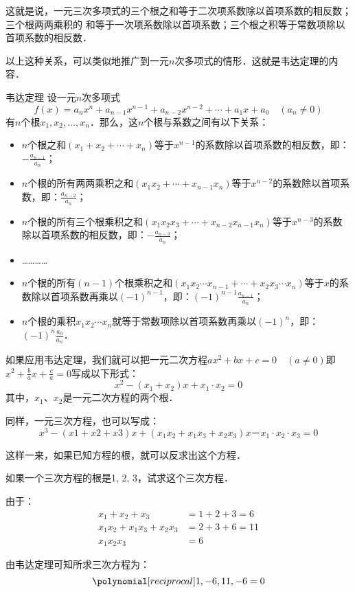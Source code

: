 这就是说，一元三次多项式的三个根之和等于二次项系数除以首项系数的相反数；三个根两两乘积的
和等于一次项系数除以首项系数；三个根之积等于常数项除以首项系数的相反数．

以上这种关系，可以类似地推广到一元$n$次多项式的情形．这就是韦达定理的内容．

\begin{blk}{韦达定理}
设一元$n$次多项式$$f(x)=a_nx^n+a_{n-1}x^{n-1}+a_{n-2}x^{n-2}+\cdots+a_1x+a_0\quad (a_n\ne 0)$$
有$n$个根$x_1,x_2,\ldots,x_n$．那么，这$n$个根与系数之间有以下关系：
\begin{itemize}
    \item $n$个根之和$(x_1+x_2+\cdots+x_n)$等于$x^{n-1}$的系数除以首项系数的相反数，即：$
    -\frac{a_{n-1}}{a_n}$；
    \item $n$个根的所有两两乘积之和$(x_1x_2+\cdots+x_{n-1}x_n)$等于$x^{n-2}$的系数除以首项系数，即：$
    \frac{a_{n-2}}{a_n}$；
    \item $n$个根的所有三个根乘积之和$(x_1x_2x_3+\cdots+x_{n-2}x_{n-1}x_n)$等于$x^{n-3}$的系数除以首项系数的相反数，即：$-\frac{a_{n-3}}{a_n}$；
    \item …………
    \item $n$个根的所有$(n-1)$个根乘积之和$(x_1x_2\cdots x_{n-1} +\cdots+ x_2x_3\cdots x_n)$等于$x$的系数除以首项系数再乘以$(-1)^{n-1}$，即：$ (-1)^{n-1}\frac{a_{n-1}}{a_n}$；
    \item $n$个根的乘积$x_1x_2\cdots x_n$就等于常数项除以首项系数再乘以$(-1)^{n}$，即：$ (-1)^{n}\frac{a_{0}}{a_n}$．
\end{itemize}
\end{blk}

如果应用韦达定理，我们就可以把一元二次方程$ax^2+bx+c=0\quad (a\ne 0)$即 $x^2+\frac{b}{a}x+\frac{c}{a}=0$写成以下形式：
\[x^2- (x_1+x_2) x+x_1\cdot x_2=0\]
其中，$x_1$、$x_2$是一元二次方程的两个根．

同样，一元三次方程，也可以写成：
\[x^3- (x1+x2+x3) x+ (x_1x_2+x_1x_3+x_2x_3) x
－x_1\cdot x_2\cdot x_3=0\]

这样一来，如果已知方程的根，就可以反求出这个方程．

\begin{example}
    如果一个三次方程的根是1, 2, 3，试求这个三次方程．
\end{example}

\begin{solution}
由于：\[\begin{split}
    x_1+x_2+x_3 &=1+2+3=6\\
    x_1x_2+x_1x_3+x_2x_3&=2+3+6=11\\
    x_1x_2x_3&=6
\end{split}\]

由韦达定理可知所求三次方程为：
\[\poly{1,-6,11,-6}=0\]
\end{solution}

